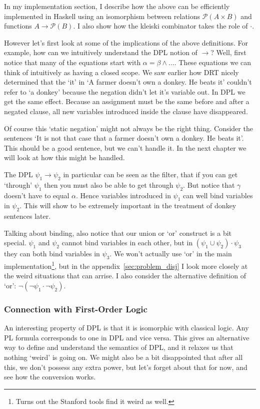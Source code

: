 \documentclass[12pt]{article}
\begin{document}
In my implementation section, I describe how the above can be efficiently implemented in Haskell using an isomorphism between relations $\mathcal{P}(A\times B)$ and functions $A\to\mathcal{P}(B)$. I also show how the kleiski combinator takes the role of $\cdot$.

However let's first look at some of the implications of the above definitions. For example, how can we intuitively understand the DPL notion of $\rightarrow$? Well, first notice that many of the equations start with $\alpha=\beta\wedge\dots$. These equations we can think of intuitively as having a closed scope. We saw earlier how DRT nicely determined that the `it' in `A farmer doesn't own a donkey. He beats it' couldn't refer to `a donkey' because the negation didn't let it's variable out. In DPL we get the same effect. Because an assignment must be the same before and after a negated clause, all new variables introduced inside the clause have disappeared.

Of course this `static negation' might not always be the right thing. Consider the sentences `It is not that case that a farmer doesn't own a donkey. He beats it'. This should be a good sentence, but we can't handle it. In the next chapter we will look at how this might be handled.

The DPL $\psi_1\rightarrow\psi_2$ in particular can be seen as the filter, that if you can get `through' $\psi_1$ then you must also be able to get through $\psi_2$. But notice that $\gamma$ doesn't have to equal $\alpha$. Hence variables introduced in $\psi_1$ can well bind variables in $\psi_2$. This will show to be extremely important in the treatment of donkey sentences later.

Talking about binding, also notice that our union or `or' construct is a bit special. $\psi_1$ and $\psi_2$ cannot bind variables in each other, but in $(\psi_1\cup\psi_2)\cdot\psi_3$ they can both bind variables in $\psi_3$. We won't actually use `or' in the main implementation\footnote{Turns out the Stanford tools find it weird as well.}, but in the appendix~\ref{sec:problem_disj} I look more closely at the weird situations that can arrise. I also consider the alternative definition of `or': $\neg(\neg\psi_1\cdot\neg\psi_2)$.

\subsubsection{Connection with First-Order Logic}

An interesting property of DPL is that it is isomorphic with classical logic. Any PL formula corresponds to one in DPL and vice versa. This gives an alternative way to define and understand the semantics of DPL, and it relaxes us that nothing `weird' is going on. We might also be a bit disappointed that after all this, we don't possess any extra power, but let's forget about that for now, and see how the conversion works.
\end{document}
